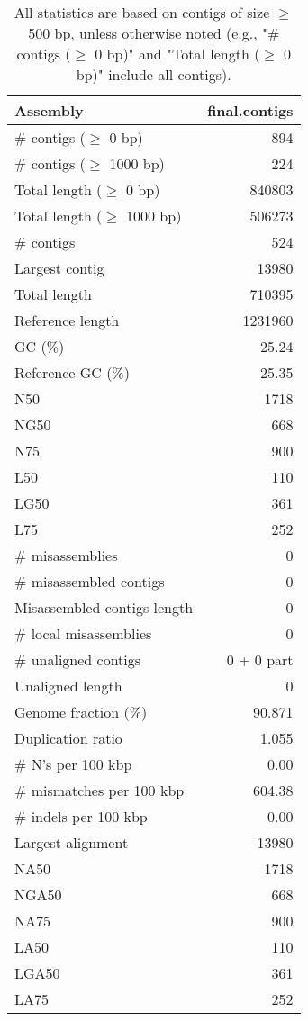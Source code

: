 \documentclass[12pt,a4paper]{article}
\begin{document}
\begin{table}[ht]
\begin{center}
\caption{All statistics are based on contigs of size $\geq$ 500 bp, unless otherwise noted (e.g., "\# contigs ($\geq$ 0 bp)" and "Total length ($\geq$ 0 bp)" include all contigs).}
\begin{tabular}{|l*{1}{|r}|}
\hline
Assembly & final.contigs \\ \hline
\# contigs ($\geq$ 0 bp) & 894 \\ \hline
\# contigs ($\geq$ 1000 bp) & 224 \\ \hline
Total length ($\geq$ 0 bp) & 840803 \\ \hline
Total length ($\geq$ 1000 bp) & 506273 \\ \hline
\# contigs & 524 \\ \hline
Largest contig & 13980 \\ \hline
Total length & 710395 \\ \hline
Reference length & 1231960 \\ \hline
GC (\%) & 25.24 \\ \hline
Reference GC (\%) & 25.35 \\ \hline
N50 & 1718 \\ \hline
NG50 & 668 \\ \hline
N75 & 900 \\ \hline
L50 & 110 \\ \hline
LG50 & 361 \\ \hline
L75 & 252 \\ \hline
\# misassemblies & 0 \\ \hline
\# misassembled contigs & 0 \\ \hline
Misassembled contigs length & 0 \\ \hline
\# local misassemblies & 0 \\ \hline
\# unaligned contigs & 0 + 0 part \\ \hline
Unaligned length & 0 \\ \hline
Genome fraction (\%) & 90.871 \\ \hline
Duplication ratio & 1.055 \\ \hline
\# N's per 100 kbp & 0.00 \\ \hline
\# mismatches per 100 kbp & 604.38 \\ \hline
\# indels per 100 kbp & 0.00 \\ \hline
Largest alignment & 13980 \\ \hline
NA50 & 1718 \\ \hline
NGA50 & 668 \\ \hline
NA75 & 900 \\ \hline
LA50 & 110 \\ \hline
LGA50 & 361 \\ \hline
LA75 & 252 \\ \hline
\end{tabular}
\end{center}
\end{table}
\end{document}
